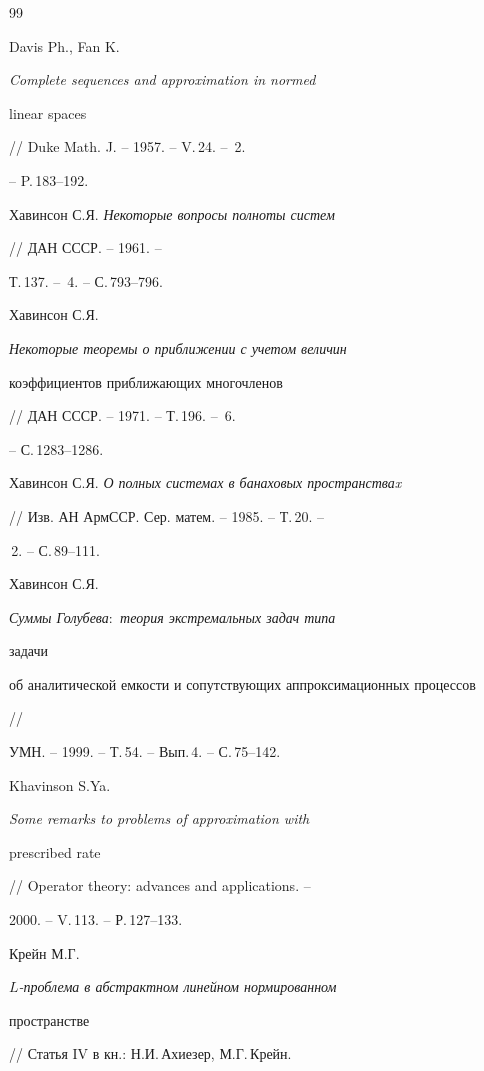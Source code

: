 \begin{thebibliography}{99} 


 




Davis Ph., Fan K. {\em Complete sequences and approximation in normed 


linear spaces} // Duke Math. J. -- 1957. -- V.\,24. -- \No\,2. 


-- P.\,183--192. 




Хавинсон С.Я. {\em Некоторые вопросы полноты систем} 


// ДАН СССР. -- 1961. -- 


Т.\,137. -- \No\,4. -- С.\,793--796. 




Хавинсон С.Я. {\em Некоторые теоремы о приближении с учетом величин 


коэффициентов приближающих многочленов} 


// ДАН СССР. -- 1971. -- Т.\,196. -- \No\,6. 


-- С.\,1283--1286. 




Хавинсон С.Я. {\em О полных системах в банаховых пространстваx} 


// Изв. АН АрмССР. Сер. матем. -- 1985. -- Т.\,20. -- 


\No\,2. -- С.\,89--111. 




Хавинсон С.Я. {\em Суммы Голубева$:$ теория экстремальных задач типа 


задачи 


об аналитической емкости и сопутствующих аппроксимационных процессов} //


УМН. -- 1999. -- Т.\,54. -- Вып.\,4. -- С.\,75--142. 




Khavinson S.Ya. {\em Some remarks to problems of approximation with 


prescribed rate} // Operator theory: advances and applications. -- 


2000. -- V.\,113. -- Р.\,127--133. 




Крейн М.Г. {\em $L$-проблема в абстрактном линейном нормированном 


пространстве} // Статья IV в кн.: Н.И.\,Ахиезер, М.Г.\,Крейн. 



\end{thebibliography}

